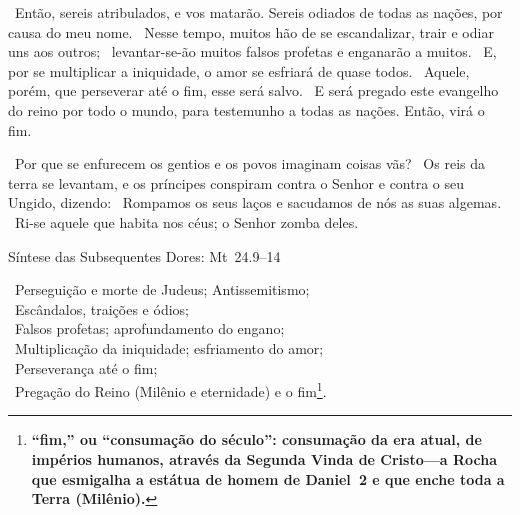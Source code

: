 \documentclass[12pt,aspectratio=169]{beamer}
\newcommand{\ver}[1]{%
    \raisebox{0.50ex}{%
        \scalebox{1.1}{%
            \pmb{\textbf{\textcolor{BSpbg}{#1}}}%
        }%
    }%
}
\newcommand{\QUOTE}[1]{%
    \par\noindent\hspace*{0.1\linewidth}%
    \begin{minipage}{0.8\linewidth}%
        \linespread{1.35}\large{#1}%
    \end{minipage}%
}
\newcommand{\WIDEQUOTE}[1]{%
    \par\noindent\hspace*{0.02\linewidth}%
    \begin{minipage}{0.92\linewidth}%
        \linespread{1.25}\large{#1}%
    \end{minipage}%
}
\newcommand{\RED}[1]{{\textcolor{TXred}{#1}}}
\newcommand{\ORA}[1]{{\textcolor{TXora}{#1}}}
\newcommand{\YEL}[1]{{\textcolor{TXyel}{#1}}}
\newcommand{\GRE}[1]{{\textcolor{TXgre}{#1}}}
\newcommand{\BLU}[1]{{\textcolor{TXblu}{#1}}}
\newcommand{\MAG}[1]{{\textcolor{TXmag}{#1}}}
\newcommand{\BRI}[1]{{\textcolor{BSpbg}{#1}}}   %
\begin{document}
    \begin{frame}
        \WIDEQUOTE{%
            \ver{(ARA) Mt~24.9}~Então, sereis \ORA{atribulados}, e \ORA{vos matarão}. Sereis
            \YEL{odiados de todas as nações}, por causa do meu nome.  \ver{10}~Nesse  tempo,
            muitos  hão  de  se  \GRE{escandalizar,  trair  e   odiar}   uns   aos   outros;
            \ver{11}~levantar-se-ão muitos \RED{falsos profetas} e \RED{enganarão} a muitos.
            \ver{12}~E, por se \MAG{multiplicar a iniquidade}, o amor se  \MAG{esfriará}  de
            quase todos. \ver{13}~Aquele, porém, que perseverar até o \BLU{fim},  esse  será
            salvo. \ver{14}~E será \BRI{pregado este evangelho do reino} por todo  o  mundo,
            para testemunho a todas as nações. Então, virá o \BLU{fim}.
        }
    \end{frame}

    \begin{frame}
        \QUOTE{%
            \ver{(ARA) Sl~2.1}~Por que  se  enfurecem  os  \ORA{gentios}  e  os  \ORA{povos}
            imaginam  coisas  vãs?  \ver{2}~Os  \YEL{reis}  da  terra  se  levantam,  e   os
            \GRE{príncipes} \RED{conspiram contra o Senhor e contra o seu Ungido},  dizendo:
            \ver{3}~\RED{Rompamos os seus laços} e \RED{sacudamos de nós as  suas  algemas}.
            \ver{4}~\MAG{Ri-se aquele que habita nos céus; o Senhor zomba deles}.
        }
    \end{frame}

    \begin{frame}{Síntese das Subsequentes Dores: Mt~24.9--14}
        \QUOTE{%
            \ver{ 9}~\YEL{Perseguição e morte de Judeus}; \ORA{Antissemitismo}; \\
            \ver{10}~\GRE{Escândalos, traições e ódios}; \\
            \ver{11}~\RED{Falsos profetas}; \RED{aprofundamento do engano}; \\
            \ver{12}~\MAG{Multiplicação da iniquidade}; \MAG{esfriamento do amor}; \\
            \ver{13}~Perseverança até o \BLU{fim}; \\
            \ver{14}~\BRI{Pregação do Reino} (Milênio e eternidade) e o \BLU{fim}\footnote{
                \textbf{``\BLU{fim},'' ou ``\BLU{consumação do século}'': consumação da  era
                atual, de impérios humanos, através da Segunda Vinda de Cristo---a Rocha que
                esmigalha a estátua de homem de Daniel~2  e  que  \BRI{enche  toda  a  Terra
                (Milênio)}.}
            }.
        }
    \end{frame}
\end{document}
